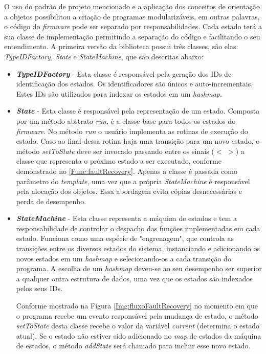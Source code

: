 O uso do padrão de projeto mencionado e a aplicação dos conceitos de orientação a objetos possibilitou a criação de programas modularizáveis, em outras palavras, o código do \textit{firmware} pode ser separado por responsabilidades. Cada estado terá a sua classe de implementação permitindo a separação do código e facilitando o seu entendimento. A primeira versão da biblioteca possui três classes, são elas: \textit{TypeIDFactory, State} e \textit{StateMachine}, que são descritas abaixo:

\begin{itemize}
	\item \textit{\textbf{TypeIDFactory}} - Esta classe é responsável pela geração dos IDs de identificação dos estados. Os identificadores são únicos e auto-incrementais. Estes IDs são utilizados para indexar os estados em um \textit{hashmap}.
	
	\item \textit{\textbf{State}} - Esta classe é responsável pela representação de um estado. Composta por um método abstrato \textit{run}, é a classe base para todos os estados do \textit{firmware}. No método \textit{run} o usuário implementa as rotinas de execução do estado. Caso ao final dessa rotina haja uma transição para um novo estado, o método \textit{setToState} deve ser invocado passando entre os sinais ($<$ $>$) a classe que representa o próximo estado a ser executado, conforme demonstrado no \autoref{Func:faultRecovery}. Apenas a classe é passada como parâmetro do \textit{template}, uma vez que a própria  \textit{StateMachine} é responsável pela alocação dos objetos. Essa abordagem evita cópias desnecessárias e perda de desempenho.
	
	\item \textit{\textbf{StateMachine}} - Esta classe representa a máquina de estados e tem a responsabilidade de controlar o despacho das funções implementadas em cada estado. Funciona como uma espécie de "engrenagem", que controla as transições entre os diversos estados do sistema, instanciando e adicionando os novos estados em um \textit{hashmap} e selecionando-os a cada transição do programa. A escolha de um \textit{hashmap} deveu-se ao seu desempenho ser superior a qualquer outra estrutura de dados, uma vez que os estados são indexados pelos seus IDs.
	
	Conforme mostrado na Figura \ref{Img:fluxoFaultRecovery} no momento em que o programa recebe um evento responsável pela mudança de estado, o método \textit{setToState} desta classe recebe o valor da variável \textit{current} (determina o estado atual). Se o estado não estiver sido adicionado no \textit{map} de estados da máquina de estados, o método \textit{addState} será chamado para incluir esse novo estado.
	

\end{itemize}
